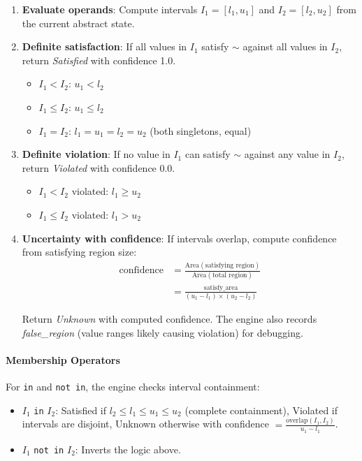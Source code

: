 \documentclass[pdflatex,sn-basic]{sn-jnl}%
\theoremstyle{thmstyleone}%
\theoremstyle{thmstyletwo}%
\theoremstyle{thmstylethree}%
\begin{document}
\begin{enumerate}
\item \textbf{Evaluate operands}: Compute intervals $I_1 = [l_1, u_1]$ and $I_2 = [l_2, u_2]$ from the current abstract state.

\item \textbf{Definite satisfaction}: If all values in $I_1$ satisfy $\sim$ against all values in $I_2$, return \textit{Satisfied} with confidence 1.0.
\begin{itemize}
  \item $I_1 < I_2$: $u_1 < l_2$
  \item $I_1 \leq I_2$: $u_1 \leq l_2$
  \item $I_1 = I_2$: $l_1 = u_1 = l_2 = u_2$ (both singletons, equal)
\end{itemize}

\item \textbf{Definite violation}: If no value in $I_1$ can satisfy $\sim$ against any value in $I_2$, return \textit{Violated} with confidence 0.0.
\begin{itemize}
  \item $I_1 < I_2$ violated: $l_1 \geq u_2$
  \item $I_1 \leq I_2$ violated: $l_1 > u_2$
\end{itemize}

\item \textbf{Uncertainty with confidence}: If intervals overlap, compute confidence from satisfying region size:
\begin{align*}
\text{confidence} &= \frac{\text{Area}(\text{satisfying region})}{\text{Area}(\text{total region})} \\
&= \frac{\text{satisfy\_area}}{(u_1 - l_1) \times (u_2 - l_2)}
\end{align*}

Return \textit{Unknown} with computed confidence. The engine also records \textit{false\_region} (value ranges likely causing violation) for debugging.
\end{enumerate}

\paragraph{Membership Operators}
For \texttt{in} and \texttt{not in}, the engine checks interval containment:
\begin{itemize}
    \item $I_1$ \texttt{in} $I_2$: Satisfied if $l_2 \leq l_1 \leq u_1 \leq u_2$ (complete containment), Violated if intervals are disjoint, Unknown otherwise with confidence $= \frac{\text{overlap}(I_1, I_2)}{u_1 - l_1}$.
    \item $I_1$ \texttt{not in} $I_2$: Inverts the logic above.
\end{itemize}
\end{document}
